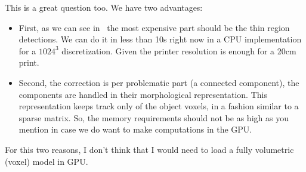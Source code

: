 \begin{enumerate}
	This is a great question too. We have two advantages:
	
\begin{itemize}
	\item First, as we can see in~\cite{Telea2011} the most expensive part should be the thin region detections. We can do it in less than 10s right now in a CPU implementation for a $1024^3$ discretization. Given the printer resolution is enough for a 20cm print.
	
	\item Second, the correction is per problematic part (a connected component), the components are handled in their morphological representation. This representation keeps track only of the object voxels, in a fashion similar to a sparse matrix. So, the memory requirements should not be as high as you mention in case we do want to make computations in the GPU.
\end{itemize}
	
	For this two reasons, I don't think that I would need to load a fully volumetric (voxel) model in GPU.
\end{enumerate}